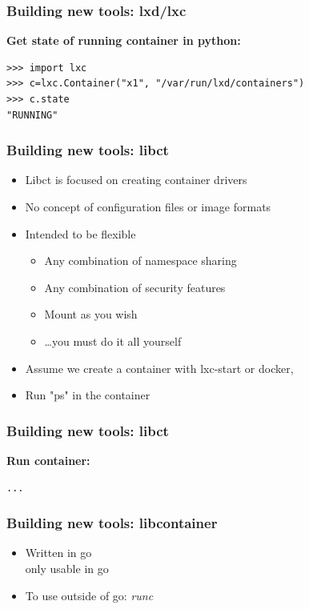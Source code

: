 \documentclass{beamer}
\begin{document}
\begin{frame}[fragile]
\frametitle{Building new tools: lxd/lxc}
{\bf Get state of running container in python:} \\
{\tiny
\begin{lstlisting}
>>> import lxc
>>> c=lxc.Container("x1", "/var/run/lxd/containers")
>>> c.state
"RUNNING"
\end{lstlisting}
}
\end{frame}

\begin{frame}
\frametitle{Building new tools: libct}
\begin{itemize}
\item Libct is focused on creating container drivers
\item No concept of configuration files or image formats
\item Intended to be flexible
  \begin{itemize}
  \item Any combination of namespace sharing
  \item Any combination of security features
  \item Mount as you wish
  \item \dots you must do it all yourself
  \end{itemize}
\item Assume we create a container with lxc-start or docker,
\item Run "ps" in the container
\end{itemize}
\end{frame}

\begin{frame}[fragile]
\frametitle{Building new tools: libct}
{\bf Run container:} \\
{\tiny
\begin{lstlisting}
...
\end{lstlisting}
}
\end{frame}

\begin{frame}
\frametitle{Building new tools: libcontainer}
\begin{itemize}
\item Written in go \\
only usable in go
\item To use outside of go: {\em runc}
\end{itemize}

\end{frame}


\end{document}
